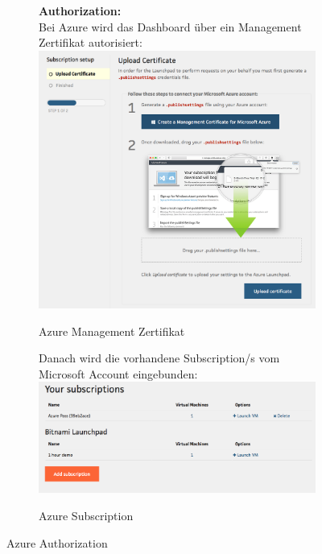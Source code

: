 \begin{figure}[!htbp]
 \begin{subfigure}[b]{.49\textwidth}
\textbf{Authorization:}\\
Bei Azure wird das Dashboard über ein Management Zertifikat autorisiert:
\includegraphics[width=\textwidth]{./03_Analyse/03_Bitnami/images/azure_authorize}
\caption{Azure Management Zertifikat}
\end{subfigure}
\hfill
 \begin{subfigure}[b]{.49\textwidth}
Danach wird die vorhandene Subscription/s vom Microsoft Account eingebunden:
\includegraphics[width=\textwidth]{./03_Analyse/03_Bitnami/images/azure_subscriptions}
\caption{Azure Subscription}
\end{subfigure}
\caption{Azure Authorization}
\end{figure}


